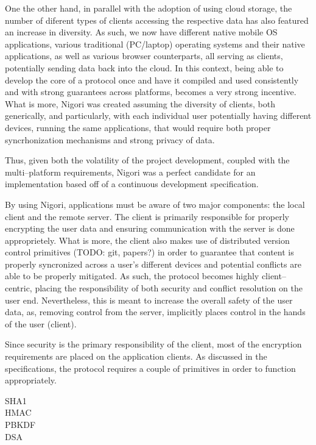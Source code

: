 One the other hand, in parallel with the adoption of using cloud storage, the number of diferent types of clients accessing the respective data has also featured an increase in diversity.
As such, we now have different native mobile OS applications, various traditional (PC/laptop) operating systems and their native applications, as well as various browser counterparts, all serving as clients, potentially sending data back into the cloud.
In this context, being able to develop the core of a protocol once and have it compiled and used consistently and with strong guarantees across platforms, becomes a very strong incentive.
What is more, Nigori was created assuming the diversity of clients, both generically, and particularly, with each individual user potentially having different devices, running the same applications, that would require both proper syncrhonization mechanisms and strong privacy of data.

Thus, given both the volatility of the project development, coupled with the multi--platform requirements, Nigori was a perfect candidate for an implementation based off of a continuous development specification.

By using Nigori, applications must be aware of two major components: the local client and the remote server.
The client is primarily responsible for properly encrypting the user data and ensuring communication with the server is done approprietely.
What is more, the client also makes use of distributed version control primitives (TODO: git, papers?) in order to guarantee that content is properly syncronized across a user's different devices and potential conflicts are able to be properly mitigated.
As such, the protocol becomes highly client--centric, placing the responsibility of both security and conflict resolution on the user end.
Nevertheless, this is meant to increase the overall safety of the user data, as, removing control from the server, implicitly places control in the hands of the user (client).

Since security is the primary responsibility of the client, most of the encryption requirements are placed on the application clients.
As discussed in the specifications, the protocol requires a couple of primitives in order to function appropriately.
\begin{description}
  \item[SHA1]
  \item[HMAC]
  \item[PBKDF]
  \item[DSA]
\end{description}


